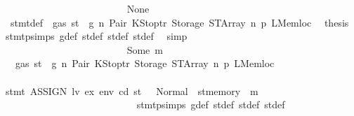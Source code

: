 \begin{isabellebody}
\ \ \ \ \ \ \ \ \ \ \ \ \ \ \ \ \ \ \ \ \ \ \ \ \isamarkupfalse%
\ None\isanewline
\ \ \ \ \ \ \ \ \ \ \ \ \ \ \ \ \ \ \ \ \ \ \ \ \isamarkupfalse%
\ {}{\isacharparenleft}{\kern0pt}{}{\isacharparenright}{\kern0pt}\ stmt{\isacharunderscore}{\kern0pt}def\ {\isacharbackquoteopen}{\isasymnot}\ gas\ st\ {\isasymle}\ g{\isacharbackquoteclose}\ n\ Pair\ KStoptr\ Storage\ STArray\ n{}\ p{}\ LMemloc\ \isamarkupfalse%
\ {\isacharquery}{\kern0pt}thesis\ \isamarkupfalse%
\ stmt{\isachardot}{\kern0pt}psimps{\isacharparenleft}{\kern0pt}{}{\isacharparenright}{\kern0pt}\ g{\isacharunderscore}{\kern0pt}def\ st{\isacharprime}{\kern0pt}{\isacharunderscore}{\kern0pt}def\ st{\isacharprime}{\kern0pt}{\isacharprime}{\kern0pt}{\isacharunderscore}{\kern0pt}def\ st{\isacharprime}{\kern0pt}{\isacharprime}{\kern0pt}{\isacharprime}{\kern0pt}{\isacharunderscore}{\kern0pt}def\ \isamarkupfalse%
\ simp\isanewline
\ \ \ \ \ \ \ \ \ \ \ \ \ \ \ \ \ \ \ \ \ \ \isamarkupfalse%
\isanewline
\ \ \ \ \ \ \ \ \ \ \ \ \ \ \ \ \ \ \ \ \ \ \ \ \isamarkupfalse%
\ {\isacharparenleft}{\kern0pt}Some\ m{\isacharparenright}{\kern0pt}\isanewline
\ \ \ \ \ \ \ \ \ \ \ \ \ \ \ \ \ \ \ \ \ \ \ \ \isamarkupfalse%
\ {}{\isacharparenleft}{\kern0pt}{}{\isacharparenright}{\kern0pt}\ {\isacharbackquoteopen}{\isasymnot}\ gas\ st\ {\isasymle}\ g{\isacharbackquoteclose}\ n\ Pair\ KStoptr\ Storage\ STArray\ n{}\ p{}\ LMemloc\isanewline
\ \ \ \ \ \ \ \ \ \ \ \ \ \ \ \ \ \ \ \ \ \ \ \ \isamarkupfalse%
\ {\isachardoublequoteopen}stmt\ {\isacharparenleft}{\kern0pt}ASSIGN\ lv\ ex{\isacharparenright}{\kern0pt}\ env\ cd\ st\ {\isacharequal}{\kern0pt}\ \ Normal\ {\isacharparenleft}{\kern0pt}{\isacharparenleft}{\kern0pt}{\isacharparenright}{\kern0pt}{\isacharcomma}{\kern0pt}\ st{\isacharprime}{\kern0pt}{\isacharprime}{\kern0pt}{\isacharprime}{\kern0pt}{\isasymlparr}memory\ {\isacharcolon}{\kern0pt}{\isacharequal}{\kern0pt}\ m{\isasymrparr}{\isacharparenright}{\kern0pt}{\isachardoublequoteclose}\isanewline
\ \ \ \ \ \ \ \ \ \ \ \ \ \ \ \ \ \ \ \ \ \ \ \ \ \ \isamarkupfalse%
\ stmt{\isachardot}{\kern0pt}psimps{\isacharparenleft}{\kern0pt}{}{\isacharparenright}{\kern0pt}\ g{\isacharunderscore}{\kern0pt}def\ st{\isacharprime}{\kern0pt}{\isacharunderscore}{\kern0pt}def\ st{\isacharprime}{\kern0pt}{\isacharprime}{\kern0pt}{\isacharunderscore}{\kern0pt}def\ st{\isacharprime}{\kern0pt}{\isacharprime}{\kern0pt}{\isacharprime}{\kern0pt}{\isacharunderscore}{\kern0pt}def\ \isamarkupfalse%

\end{isabellebody}

